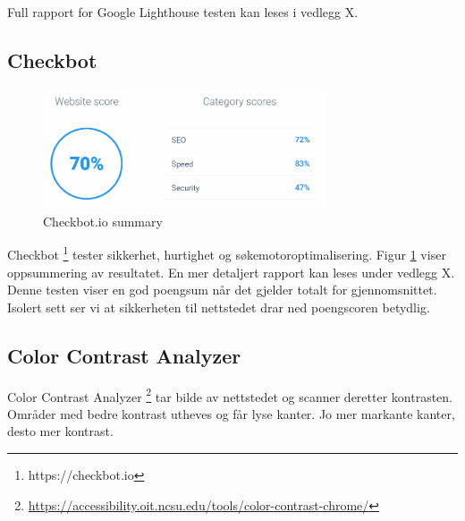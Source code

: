 Full rapport for Google Lighthouse testen kan leses i vedlegg X.

\subsection{Checkbot}

\begin{figure}[H]
    \centering
    \includegraphics[width=0.75\textwidth]{bjornar/checkbotio-summary.png}
    \caption{Checkbot.io summary}
    \label{fig:analysis-current-checkbot-summary}
\end{figure}

Checkbot \footnote{https://checkbot.io} tester sikkerhet, hurtighet og søkemotoroptimalisering. Figur \ref{fig:analysis-current-checkbot-summary} viser oppsummering av resultatet. En mer detaljert rapport kan leses under vedlegg X. Denne testen viser en god poengsum når det gjelder totalt for gjennomsnittet. Isolert sett ser vi at sikkerheten til nettstedet drar ned poengscoren betydlig.

\subsection{Color Contrast Analyzer}
\label{sec:analysis-current-color-contrast-analyzer}
Color Contrast Analyzer \footnote{\url{https://accessibility.oit.ncsu.edu/tools/color-contrast-chrome/}} tar bilde av nettstedet og scanner deretter kontrasten. Områder med bedre kontrast utheves og får lyse kanter. Jo mer markante kanter, desto mer kontrast.

